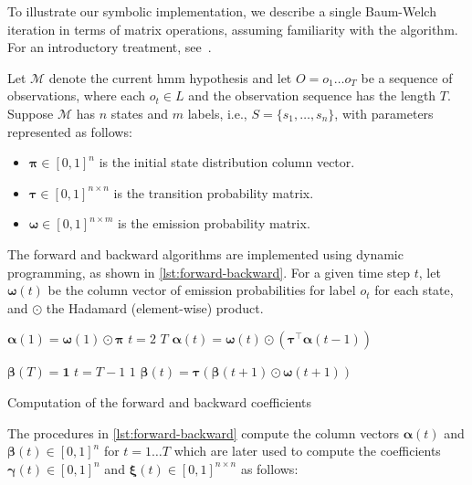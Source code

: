To illustrate our symbolic implementation, we describe a single Baum-Welch iteration in terms of matrix operations, assuming familiarity with the algorithm. For an introductory treatment, see~\cite{Baum70,reynouard2024learning}.

Let $\mathcal{M}$ denote the current \gls{hmm} hypothesis and let $O = o_1 \dots o_T$ be a sequence of observations, where each $o_t \in L$ and the observation sequence has the length $T$. Suppose $\mathcal{M}$ has $n$ states and $m$ labels, i.e., $S = \{s_1, \dots, s_n\}$, with parameters represented as follows:


\begin{itemize}
    \item $\pmb{\pi} \in [0,1]^{n}$ is the initial state distribution column vector.
    \item $\pmb{\tau} \in [0,1]^{n \times n}$ is the transition probability matrix.
    \item $\pmb{\omega} \in [0,1]^{n \times m}$ is the emission probability matrix.
\end{itemize}


The forward and backward algorithms are implemented using dynamic programming, as shown in \autoref{lst:forward-backward}.
For a given time step $t$, let $\pmb{\omega}(t)$ be the column vector of emission probabilities for label $o_t$ for each state, and $\odot$ the Hadamard (element-wise) product.


\begin{listing}[htb!]
    \begin{codebox}
        \li $\pmb{\alpha}(1) = \pmb{\omega}(1) \odot \pmb{\pi}$
        \li \For $t = 2$ \To $T$ \Do
        \li $\pmb{\alpha}(t) = \pmb{\omega}(t) \odot \left( \pmb{\tau}^\top \pmb{\alpha}(t-1) \right)$
        \End
    \end{codebox}
    \begin{codebox}
        \li $\pmb{\beta}(T) = \mathbf{1}$
        \li \For $t = T-1$ \To $1$ \Do
        \li $\pmb{\beta}(t) = \pmb{\tau} \left( \pmb{\beta}(t+1) \odot \pmb{\omega}(t+1) \right)$
        \End
    \end{codebox}
    \caption{Computation of the forward and backward coefficients}
    \label{lst:forward-backward}
\end{listing}


The procedures in \autoref{lst:forward-backward} compute the column vectors $\pmb{\alpha}(t)$ and $\pmb{\beta}(t) \in [0,1]^{n}$ for $t = 1\dots T$ which are later used to compute the coefficients $\pmb{\gamma}(t) \in [0,1]^{n}$ and $\pmb{\xi}(t) \in [0,1]^{n \times n}$ as follows:

